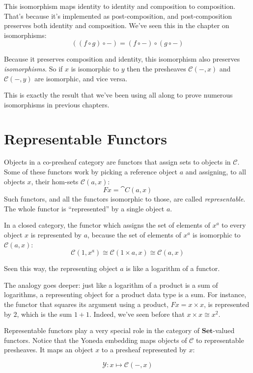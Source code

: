 \documentclass[DaoFP]{subfiles}
\begin{document}
This isomorphism maps identity to identity and composition to composition. That's because it's implemented as post-composition, and post-composition preserves both identity and composition. We've seen this in the chapter on isomorphisms:
\[ ((f \circ g) \circ -) = (f \circ -) \circ (g \circ -) \]

Because it preserves composition and identity, this isomorphism also preserves \emph{isomorphisms}. So if $x$ is isomorphic to $y$ then the presheaves $ \mathcal{C}(-, x)$ and $ \mathcal{C}(-, y)$ are isomorphic, and vice versa. 

This is exactly the result that we've been using all along to prove numerous isomorphisms in previous chapters. 

\section{Representable Functors}

Objects in a  co-presheaf category are functors that assign sets to objects in $\mathcal{C}$. Some of these functors work by picking a reference object $a$ and assigning,  to all objects $x$, their hom-sets  $\mathcal{C}(a, x)$:
\[ F x = \cat C(a, x) \]
Such functors, and all the functors isomorphic to those, are called \emph{representable}. The whole functor is ``represented'' by a single object $a$. 

In a closed category, the functor which assigns the set of elements of $x^a$ to every object $x$ is represented by $a$, because the set of elements of $x^a$ is isomorphic to $\mathcal{C}(a, x)$:
\[\mathcal{C}(1, x^a) \cong \mathcal{C}(1 \times a, x) \cong \mathcal{C} (a, x)\]

Seen this way, the representing object $a$ is like a logarithm of a functor. 

The analogy goes deeper: just like a logarithm of a product is a sum of logarithms, a representing object for a product data type is a sum. For instance, the functor that squares its argument using a product, $F x = x \times x$, is represented by $2$, which is the sum $1 + 1$. Indeed, we've seen before that $x \times x \cong x^2$.

Representable functors play a very special role in the category of $ \mathbf{Set}$-valued functors. Notice that the Yoneda embedding maps objects of $\mathcal{C}$ to representable presheaves. It maps an object $x$ to a presheaf represented by $x$: 

\[  \mathcal{Y} \colon x \mapsto \mathcal{C}(-, x) \]
\end{document}
